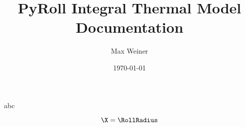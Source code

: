 \documentclass{template/PyRollDocs}
\begin{document}
    \author{Max Weiner}
    \date{\today}
    \title{PyRoll Integral Thermal Model Documentation}

    \maketitle

    \X abc

    \begin{equation}
        \X = \RollRadius
        \label{eq:1}
    \end{equation}

\end{document}
